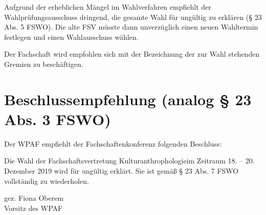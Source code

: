 \documentclass[a4paper]{scrartcl}
\newcommand{\fachschaft}{Kulturanthrophologie}
\newcommand{\wahltermin}{18. -- 20. Dezember 2019}
\newcommand{\vorsitz}{Fiona Oberem}
\begin{document}
 Aufgrund der erheblichen Mängel im Wahlverfahren empfiehlt der Wahlprüfungsausschuss dringend, die  gesamte Wahl für ungültig zu erklären (§ 23 Abs. 5 FSWO). Die alte FSV müsste dann unverzüglich einen neuen Wahltermin festlegen und einen Wahlausschuss wählen.

Der Fachschaft wird empfohlen sich mit der Bezeichnung der zur Wahl stehenden Gremien zu beschäftigen.


\section*{Beschlussempfehlung (analog § 23 Abs. 3 FSWO)}

Der WPAF empfiehlt der Fachschaftenkonferenz folgenden Beschluss:

\vspace{1em}


 Die Wahl der Fachschaftsvertretung \fachschaft im Zeitraum \wahltermin{ }wird für ungültig erklärt. Sie ist gemäß § 23 Abs. 7 FSWO vollständig zu wiederholen.

gez. \vorsitz\\
Vorsitz des WPAF
\end{document}
